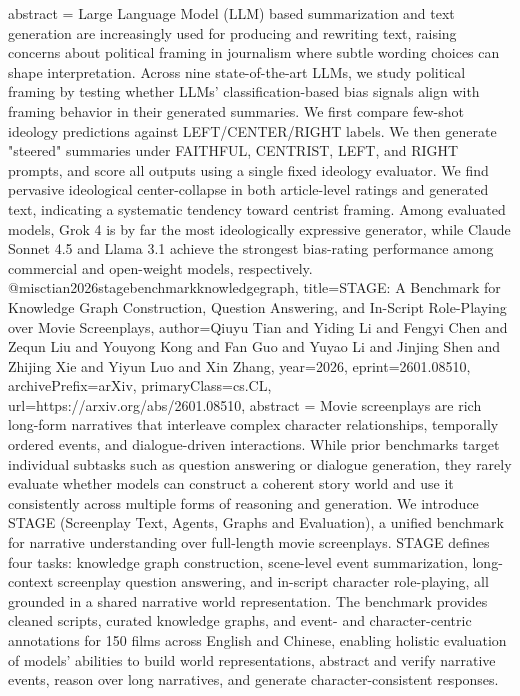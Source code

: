 {      abstract = {Large Language Model (LLM) based summarization and text generation are increasingly used for producing and rewriting text, raising concerns about political framing in journalism where subtle wording choices can shape interpretation. Across nine state-of-the-art LLMs, we study political framing by testing whether LLMs' classification-based bias signals align with framing behavior in their generated summaries. We first compare few-shot ideology predictions against LEFT/CENTER/RIGHT labels. We then generate "steered" summaries under FAITHFUL, CENTRIST, LEFT, and RIGHT prompts, and score all outputs using a single fixed ideology evaluator. We find pervasive ideological center-collapse in both article-level ratings and generated text, indicating a systematic tendency toward centrist framing. Among evaluated models, Grok 4 is by far the most ideologically expressive generator, while Claude Sonnet 4.5 and Llama 3.1 achieve the strongest bias-rating performance among commercial and open-weight models, respectively.}
}@misc{tian2026stagebenchmarkknowledgegraph,
      title={STAGE: A Benchmark for Knowledge Graph Construction, Question Answering, and In-Script Role-Playing over Movie Screenplays}, 
      author={Qiuyu Tian and Yiding Li and Fengyi Chen and Zequn Liu and Youyong Kong and Fan Guo and Yuyao Li and Jinjing Shen and Zhijing Xie and Yiyun Luo and Xin Zhang},
      year={2026},
      eprint={2601.08510},
      archivePrefix={arXiv},
      primaryClass={cs.CL},
      url={https://arxiv.org/abs/2601.08510},
      abstract = {Movie screenplays are rich long-form narratives that interleave complex character relationships, temporally ordered events, and dialogue-driven interactions. While prior benchmarks target individual subtasks such as question answering or dialogue generation, they rarely evaluate whether models can construct a coherent story world and use it consistently across multiple forms of reasoning and generation. We introduce STAGE (Screenplay Text, Agents, Graphs and Evaluation), a unified benchmark for narrative understanding over full-length movie screenplays. STAGE defines four tasks: knowledge graph construction, scene-level event summarization, long-context screenplay question answering, and in-script character role-playing, all grounded in a shared narrative world representation. The benchmark provides cleaned scripts, curated knowledge graphs, and event- and character-centric annotations for 150 films across English and Chinese, enabling holistic evaluation of models' abilities to build world representations, abstract and verify narrative events, reason over long narratives, and generate character-consistent responses.}
}
